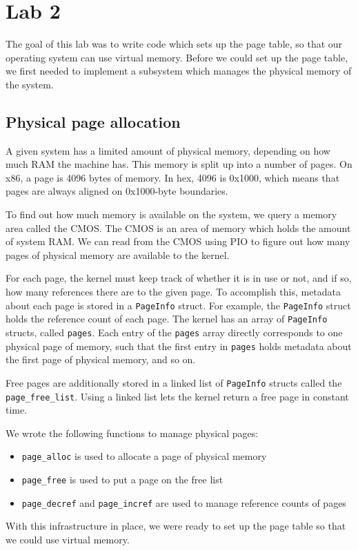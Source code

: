 \documentclass{article}
\begin{document}

\section{Lab 2}

The goal of this lab was to write code which sets up the page table, so that
our operating system can use virtual memory. Before we could set up the page
table, we first needed to implement a subsystem which manages the physical
memory of the system.

\subsection{Physical page allocation}
A given system has a limited amount of physical memory, depending on how much
RAM the machine has. This memory is split up into a number of pages. On x86, a
page is 4096 bytes of memory. In hex, 4096 is 0x1000, which means that pages
are always aligned on 0x1000-byte boundaries.

To find out how much memory is available on the system, we query a memory area
called the CMOS. The CMOS is an area of memory which holds the amount of
system RAM. We can read from the CMOS using PIO to figure out how many pages
of physical memory are available to the kernel.

For each page, the kernel must keep track of whether it is in use or not, and
if so, how many references there are to the given page. To accomplish this,
metadata about each page is stored in a \texttt{PageInfo} struct. For example,
the \texttt{PageInfo} struct holds the reference count of each page. The
kernel has an array of \texttt{PageInfo} structs, called \texttt{pages}.
Each entry of the \texttt{pages} array directly corresponds to one physical
page of memory, such that the first entry in \texttt{pages} holds metadata
about the first page of physical memory, and so on.

Free pages are additionally stored in a linked list of \texttt{PageInfo}
structs called the \texttt{page\_free\_list}. Using a linked list lets the
kernel return a free page in constant time.

We wrote the following functions to manage physical pages:
\begin{itemize}
\item \texttt{page\_alloc} is used to allocate a page of physical memory
\item \texttt{page\_free} is used to put a page on the free list
\item \texttt{page\_decref} and \texttt{page\_incref} are used to manage
reference counts of pages
\end{itemize}
With this infrastructure in place, we were ready to set up the page table so
that we could use virtual memory.
\end{document}
